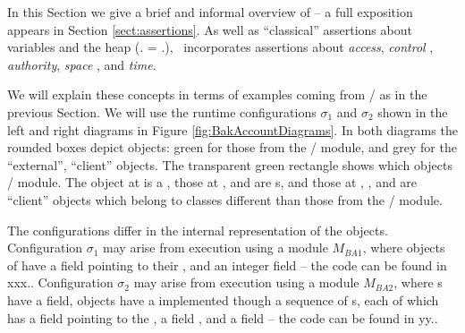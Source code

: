  
In this Section we  give a brief and informal  overview of %
\Chainmail -- a full exposition appears in Section \ref{sect:assertions}.
As well as   ``classical'' assertions 
 about  variables and the heap (\eg  {}. = .),
\Chainmail\ incorporates assertions   about
%
\textit{access},
%
\textit{control} ,
%
\textit{authority},
%
\textit{space} , %
%
and
%
\textit{time}.
%



 We  will explain these concepts in terms of examples coming from  / as  in the previous Section.
We will use the runtime configurations $\sigma_1$ and $\sigma_2$ 
shown in the left and right diagrams in Figure \ref{fig:BakAccountDiagrams}.
In both diagrams the rounded boxes depict objects:  green for those from the 
/  module, and grey for the ``external'',  ``client'' objects.
The transparent green rectangle  shows which objects /  module.
The object at  is a , those at ,  and  are 
s, and those at , ,  and  are 
``client'' objects which belong to classes different than those from the /  module.

The configurations differ in the internal representation of the objects. 
Configuration  $\sigma_1$ may arise from execution using a module $M_{BA1}$, where   objects of
  have a field  pointing to their , and an integer field  
-- the code can be found in xxx.. 
Configuration  $\sigma_2$ may arise from execution using a module $M_{BA2}$,  where s have a 
field,   objects  have a  implemented though a sequence of s, each of which has a 
 field pointing to the , a field , and a field   -- the code can be found in yy..

